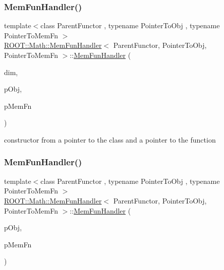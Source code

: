 \subsubsection{\texorpdfstring{MemFunHandler()}{MemFunHandler()}\hspace{0.1cm}{\footnotesize\ttfamily [2/6]}}
{\footnotesize\ttfamily template$<$class Parent\+Functor , typename Pointer\+To\+Obj , typename Pointer\+To\+Mem\+Fn $>$ \\
\mbox{\hyperlink{classROOT_1_1Math_1_1MemFunHandler}{R\+O\+O\+T\+::\+Math\+::\+Mem\+Fun\+Handler}}$<$ Parent\+Functor, Pointer\+To\+Obj, Pointer\+To\+Mem\+Fn $>$\+::\mbox{\hyperlink{classROOT_1_1Math_1_1MemFunHandler}{Mem\+Fun\+Handler}} (\begin{DoxyParamCaption}\item[{unsigned int}]{dim,  }\item[{const Pointer\+To\+Obj \&}]{p\+Obj,  }\item[{Pointer\+To\+Mem\+Fn}]{p\+Mem\+Fn }\end{DoxyParamCaption})\hspace{0.3cm}{\ttfamily [inline]}}



constructor from a pointer to the class and a pointer to the function 

\mbox{\label{classROOT_1_1Math_1_1MemFunHandler_a714877219c36aab344b3785be06affcc}} 
\subsubsection{\texorpdfstring{MemFunHandler()}{MemFunHandler()}\hspace{0.1cm}{\footnotesize\ttfamily [3/6]}}
{\footnotesize\ttfamily template$<$class Parent\+Functor , typename Pointer\+To\+Obj , typename Pointer\+To\+Mem\+Fn $>$ \\
\mbox{\hyperlink{classROOT_1_1Math_1_1MemFunHandler}{R\+O\+O\+T\+::\+Math\+::\+Mem\+Fun\+Handler}}$<$ Parent\+Functor, Pointer\+To\+Obj, Pointer\+To\+Mem\+Fn $>$\+::\mbox{\hyperlink{classROOT_1_1Math_1_1MemFunHandler}{Mem\+Fun\+Handler}} (\begin{DoxyParamCaption}\item[{const Pointer\+To\+Obj \&}]{p\+Obj,  }\item[{Pointer\+To\+Mem\+Fn}]{p\+Mem\+Fn }\end{DoxyParamCaption})\hspace{0.3cm}{\ttfamily [inline]}}




